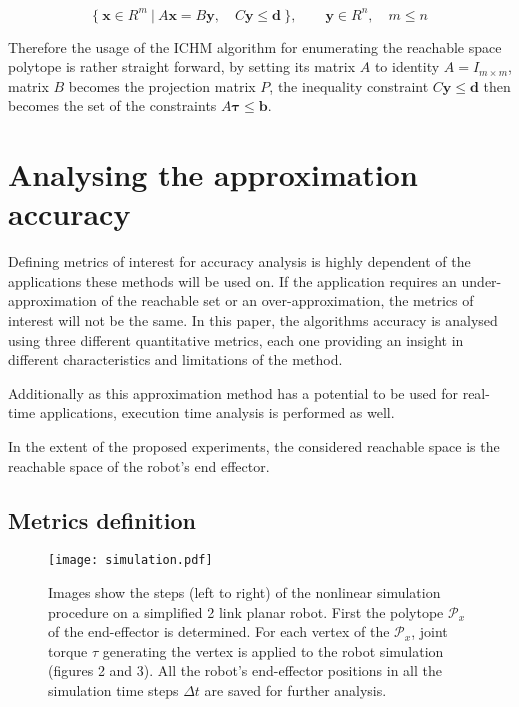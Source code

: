 \begin{equation}
\{ ~\bm{x}\in R^{m} ~|~ A\bm{x} = B\bm{y},\quad C\bm{y} \leq \bm{d}~\}, \qquad \bm{y} \in R^n,\quad m \leq n
\end{equation}

Therefore the usage of the ICHM algorithm for enumerating the reachable space polytope is rather straight forward, by setting its matrix $A$ to identity $A=I_{m \times m}$, matrix $B$ becomes the projection matrix $P$, the inequality constraint $C\bm{y} \leq \bm{d}$ then becomes the set of the constraints $A\bm{\tau}\leq\bm{b}$.


\section{Analysing the approximation accuracy}
\label{ch:analysis}

Defining metrics of interest for accuracy analysis is highly dependent of the applications these methods will be used on. If the application requires an under-approximation of the reachable set or an over-approximation, the metrics of interest will not be the same. In this paper, the algorithms accuracy is analysed using three different quantitative metrics, each one providing an insight in different characteristics and limitations of the method. 

Additionally as this approximation method has a potential to be used for real-time applications, execution time analysis is performed as well. 

In the extent of the proposed experiments, the considered reachable space is the reachable space of the robot's end effector. 

\subsection{Metrics definition}


\begin{figure}[!t]
    \centering
    \texttt{[image: simulation.pdf]}
    \caption{Images show the steps (left to right) of the nonlinear simulation procedure on a simplified 2 link planar robot. First the polytope $\mathcal{P}_x$ of the end-effector is determined. For each vertex of the $\mathcal{P}_x$, joint torque $\tau$ generating the vertex is applied to the robot simulation (figures 2 and 3). All the robot's end-effector positions in all the simulation time steps $\Delta t$ are saved for further analysis.}
    \label{fig:simulation}
\vspace{-0.3cm}
\end{figure}


